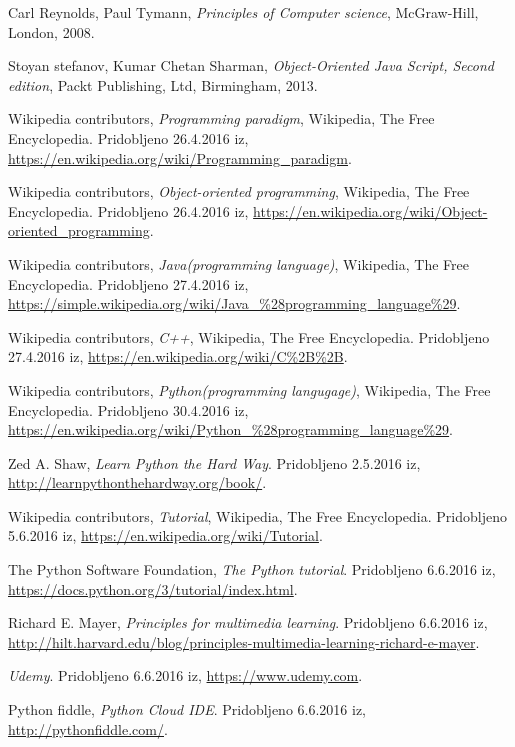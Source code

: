\begin{thebibliography}{9}
 Carl Reynolds, Paul Tymann, \emph{Principles of Computer science},
  McGraw-Hill, London, 2008.

 Stoyan stefanov, Kumar Chetan Sharman, \emph{Object-Oriented Java Script,
    Second edition}, Packt Publishing, Ltd, Birmingham, 2013.

 Wikipedia contributors, \emph{Programming paradigm}, Wikipedia, The Free Encyclopedia. Pridobljeno
  26.4.2016 iz,
  \url{https://en.wikipedia.org/wiki/Programming_paradigm}.

 Wikipedia contributors, \emph{Object-oriented
    programming}, Wikipedia, The Free Encyclopedia. Pridobljeno
  26.4.2016 iz,
  \url{https://en.wikipedia.org/wiki/Object-oriented_programming}.

 Wikipedia contributors, \emph{Java(programming
    language)}, Wikipedia, The Free Encyclopedia. Pridobljeno
  27.4.2016 iz,
  \url{https://simple.wikipedia.org/wiki/Java_%28programming_language%29}.

 Wikipedia contributors, \emph{C++}, Wikipedia, The
  Free Encyclopedia. Pridobljeno 27.4.2016 iz,
  \url{https://en.wikipedia.org/wiki/C%2B%2B}.

 Wikipedia contributors, \emph{Python(programming
    langugage)}, Wikipedia, The
  Free Encyclopedia. Pridobljeno 30.4.2016 iz,
  \url{https://en.wikipedia.org/wiki/Python_%28programming_language%29}.

  Zed A. Shaw, \emph{Learn Python the Hard Way}. Pridobljeno 2.5.2016
  iz, \url{http://learnpythonthehardway.org/book/}.

 Wikipedia contributors, \emph{Tutorial},
  Wikipedia, The Free Encyclopedia. Pridobljeno 5.6.2016 iz,
  \url{https://en.wikipedia.org/wiki/Tutorial}.

 The Python Software Foundation, \emph{The
    Python tutorial}. Pridobljeno 6.6.2016 iz,
  \url{https://docs.python.org/3/tutorial/index.html}.

 Richard E. Mayer, \emph{Principles for multimedia learning}. Pridobljeno 6.6.2016 iz,
  \url{http://hilt.harvard.edu/blog/principles-multimedia-learning-richard-e-mayer}.

 \emph{Udemy}. Pridobljeno 6.6.2016 iz,
  \url{https://www.udemy.com}.

 Python fiddle, \emph{Python Cloud
    IDE}. Pridobljeno 6.6.2016 iz,
  \url{http://pythonfiddle.com/}.


\end{thebibliography}
